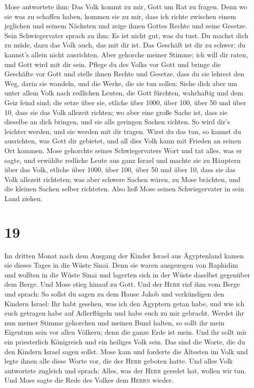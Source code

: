  Mose antwortete ihm: Das Volk kommt zu mir, Gott um Rat
zu fragen.  Denn wo sie was zu schaffen haben, kommen sie
zu mir, dass ich richte zwischen einem jeglichen und seinem Nächsten und
zeige ihnen Gottes Rechte und seine Gesetze.  Sein
Schwiegervater sprach zu ihm: Es ist nicht gut, was du tust.
 Du machst dich zu müde, dazu das Volk auch, das mit dir
ist. Das Geschäft ist dir zu schwer; du kannst's allein nicht
ausrichten.  Aber gehorche meiner Stimme; ich will dir
raten, und Gott wird mit dir sein. Pflege du des Volks vor Gott und
bringe die Geschäfte vor Gott  und stelle ihnen Rechte
und Gesetze, dass du sie lehrest den Weg, darin sie wandeln, und die
Werke, die sie tun sollen.  Siehe dich aber um unter
allem Volk nach redlichen Leuten, die Gott fürchten, wahrhaftig und dem
Geiz feind sind; die setze über sie, etliche über 1000, über 100, über
50 und über 10,  dass sie das Volk allezeit richten; wo
aber eine große Sache ist, dass sie dieselbe an dich bringen, und sie
alle geringen Sachen richten. So wird dir's leichter werden, und sie
werden mit dir tragen.  Wirst du das tun, so kannst du
ausrichten, was Gott dir gebietet, und all dies Volk kann mit Frieden an
seinen Ort kommen.  Mose gehorchte seines Schwiegervaters
Wort und tat alles, was er sagte,  und erwählte redliche
Leute aus ganz Israel und machte sie zu Häuptern über das Volk, etliche
über 1000, über 100, über 50 und über 10,  dass sie das
Volk allezeit richteten; was aber schwere Sachen wären, zu Mose
brächten, und die kleinen Sachen selber richteten.  Also
ließ Mose seinen Schwiegervater in sein Land ziehen.

\hypertarget{section-18}{%
\section{19}\label{section-18}}

 Im dritten Monat nach dem Ausgang der Kinder Israel aus
Ägyptenland kamen sie dieses Tages in die Wüste Sinai. 
Denn sie waren ausgezogen von Raphidim und wollten in die Wüste Sinai
und lagerten sich in der Wüste daselbst gegenüber dem Berge.
 Und Mose stieg hinauf zu Gott. Und der \textsc{Herr} rief
ihm vom Berge und sprach: So sollst du sagen zu dem Hause Jakob und
verkündigen den Kindern Israel:  Ihr habt gesehen, was ich
den Ägyptern getan habe, und wie ich euch getragen habe auf Adlerflügeln
und habe euch zu mir gebracht.  Werdet ihr nun meiner
Stimme gehorchen und meinen Bund halten, so sollt ihr mein Eigentum sein
vor allen Völkern; denn die ganze Erde ist mein.  Und ihr
sollt mir ein priesterlich Königreich und ein heiliges Volk sein. Das
sind die Worte, die du den Kindern Israel sagen sollst. 
Mose kam und forderte die Ältesten im Volk und legte ihnen alle diese
Worte vor, die der \textsc{Herr} geboten hatte.  Und alles
Volk antwortete zugleich und sprach: Alles, was der \textsc{Herr}
geredet hat, wollen wir tun. Und Mose sagte die Rede des Volkes dem
\textsc{Herrn} wieder.

